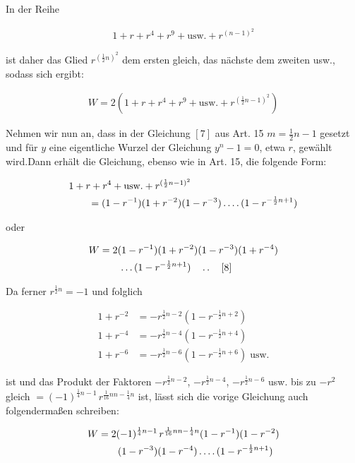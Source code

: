 In der Reihe

\[
\begin{aligned}
1+r+r^4+r^9+\text{usw.}+r^{(n-1)^2}
\end{aligned}
\]

ist daher das Glied $r^{(\frac12n)^2}$ dem ersten gleich, das nächste dem zweiten usw., sodass sich ergibt:

\[
\begin{aligned}
W=2(1+r+r^4+r^9+\text{usw.}+r^{(\frac12n-1)^2})
\end{aligned}
\]

Nehmen wir nun an, dass in der Gleichung $[7]$ aus Art. 15 $m=\frac12n-1$ gesetzt und für $y$ eine eigentliche Wurzel der Gleichung $y^n-1=0$, etwa $r$, gewählt wird.\quad Dann erhält die Gleichung, ebenso wie in Art. 15, die folgende Form:

\[
\begin{aligned}
&1+r+r^4+\text{usw.}+r^{(\frac12n-1)^2}\\&\qquad=(1-r^{-1})(1+r^{-2})(1-r^{-3})\mathinner{.\,.\,.\,.}(1-r^{-\frac12n+1})
\end{aligned}
\]


oder

\[
\begin{aligned}
W&=2(1-r^{-1})(1+r^{-2})(1-r^{-3})(1+r^{-4})\\&\qquad\ldots(1-r^{-\frac12n+1})\quad\mathinner{.\,.}\quad[8]
\end{aligned}
\]

Da ferner $r^{\frac12n}=-1$ und folglich

\[
\begin{aligned}
1+r^{-2}&=-r^{\frac12n-2}(1-r^{-\frac12n+2})\\
1+r^{-4}&=-r^{\frac12n-4}(1-r^{-\frac12n+4})\\
1+r^{-6}&=-r^{\frac12n-6}(1-r^{-\frac12n+6})\;\text{usw.}
\end{aligned}
\]

ist und das Produkt der Faktoren $-r^{\frac12n-2}$, $-r^{\frac12n-4}$, $-r^{\frac12n-6}$ usw. bis zu $-r^2$ gleich $=(-1)^{\frac14n-1}\,r^{\frac1{16}nn-\frac14n}$ ist, lässt sich die vorige Gleichung auch folgendermaßen schreiben:

\[
\begin{aligned}
W&=2(-1)^{\frac14n-1}\,r^{\frac1{16}nn-\frac14n}(1-r^{-1})(1-r^{-2})\\&\qquad(1-r^{-3})(1-r^{-4})\mathinner{.\,.\,.\,.}(1-r^{-\frac12n+1})
\end{aligned}
\]

